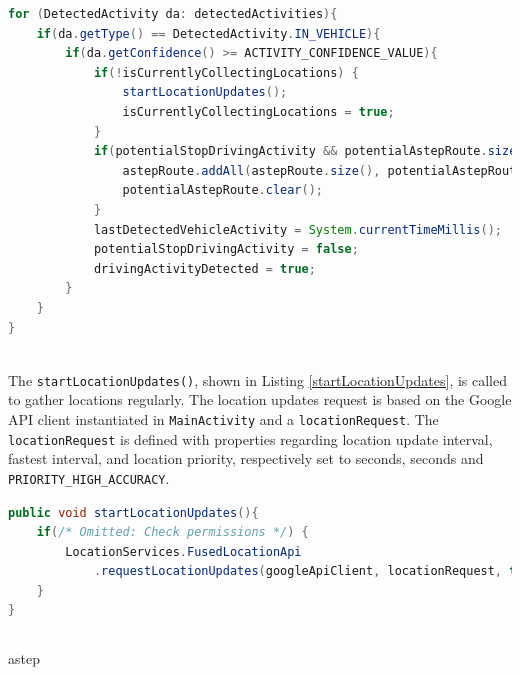 \begin{lstlisting}[language=Java, label=activityRecognitionIteration, caption=Iteration over received list of activity recognition.]
for (DetectedActivity da: detectedActivities){
	if(da.getType() == DetectedActivity.IN_VEHICLE){
		if(da.getConfidence() >= ACTIVITY_CONFIDENCE_VALUE){
			if(!isCurrentlyCollectingLocations) {
				startLocationUpdates();
				isCurrentlyCollectingLocations = true;
			}
			if(potentialStopDrivingActivity && potentialAstepRoute.size() > 0){
				astepRoute.addAll(astepRoute.size(), potentialAstepRoute);
				potentialAstepRoute.clear();
			}
			lastDetectedVehicleActivity = System.currentTimeMillis();
			potentialStopDrivingActivity = false;
			drivingActivityDetected = true;
		}
	}
}
\end{lstlisting}

\DIFaddbegin \textbf{}\\
\DIFaddend The \texttt{startLocationUpdates()}, shown in Listing \ref{startLocationUpdates}, is called to gather locations regularly.
The location updates request is based on the Google API client instantiated in \texttt{MainActivity} and a \texttt{locationRequest}.
The \texttt{locationRequest} is defined with properties regarding location update interval, fastest interval, and location \DIFdelbegin {}\DIFdelend \DIFaddbegin {}\DIFaddend priority, respectively set to \DIFdelbegin %
 seconds, \DIFdelbegin {}\DIFdelend \DIFaddbegin {}\DIFaddend seconds and \texttt{PRIORITY\_HIGH\_ACCURACY}.

\begin{lstlisting}[language=Java, label=startLocationUpdates, caption=Start location updates functions.]
public void startLocationUpdates(){
	if(/* Omitted: Check permissions */) {
		LocationServices.FusedLocationApi
			.requestLocationUpdates(googleApiClient, locationRequest, this);
	}
}
\end{lstlisting}

\DIFdelbegin {}\DIFdelend \DIFaddbegin \subsection{}
\DIFaddend \gls{astep} \DIFdelbegin {}\DIFdelend \DIFaddbegin {}\DIFaddend 



